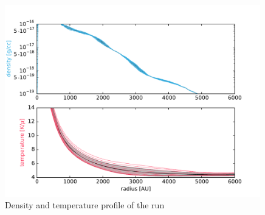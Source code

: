 \begin{figure}[!htb]
 \centering
 \includegraphics[width=0.99\textwidth]{Figures/var_rt_profiles/timeave_n10c01_6000AU}
 \captionsetup{justification=justified,singlelinecheck=false,width=\linewidth}
 \decoRule
 \caption[ profiles]{Density and temperature profile of the  run}
\label{fig:n10c0.1_profile}
\end{figure}
\FloatBarrier


